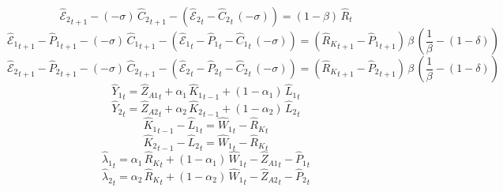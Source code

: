 \begin{dmath}
{{\hat{\mathscr{E}}_{2}}}_{t+1}-\left(-{{\sigma}}\right)\, {{\hat{C}_{2}}}_{t+1}-\left({{\hat{\mathscr{E}}_{2}}}_{t}-{{\hat{C}_{2}}}_{t}\, \left(-{{\sigma}}\right)\right)=\left(1-{{\beta}}\right)\, {{\hat{R}}}_{t}
\end{dmath}
\begin{dmath}
{{\hat{\mathscr{E}}_{1}}}_{t+1}-{{\hat{P}_{1}}}_{t+1}-\left(-{{\sigma}}\right)\, {{\hat{C}_{1}}}_{t+1}-\left({{\hat{\mathscr{E}}_{1}}}_{t}-{{\hat{P}_{1}}}_{t}-{{\hat{C}_{1}}}_{t}\, \left(-{{\sigma}}\right)\right)=\left({{\hat{R}_{K}}}_{t+1}-{{\hat{P}_{1}}}_{t+1}\right)\, {{\beta}}\, \left(\frac{1}{{{\beta}}}-\left(1-{{\delta}}\right)\right)
\end{dmath}
\begin{dmath}
{{\hat{\mathscr{E}}_{2}}}_{t+1}-{{\hat{P}_{2}}}_{t+1}-\left(-{{\sigma}}\right)\, {{\hat{C}_{2}}}_{t+1}-\left({{\hat{\mathscr{E}}_{2}}}_{t}-{{\hat{P}_{2}}}_{t}-{{\hat{C}_{2}}}_{t}\, \left(-{{\sigma}}\right)\right)=\left({{\hat{R}_{K}}}_{t+1}-{{\hat{P}_{2}}}_{t+1}\right)\, {{\beta}}\, \left(\frac{1}{{{\beta}}}-\left(1-{{\delta}}\right)\right)
\end{dmath}
\begin{dmath}
{{\hat{Y}_{1}}}_{t}={{\hat{Z}_{A1}}}_{t}+{{\alpha_{1}}}\, {{\hat{K}_{1}}}_{t-1}+\left(1-{{\alpha_{1}}}\right)\, {{\hat{L}_{1}}}_{t}
\end{dmath}
\begin{dmath}
{{\hat{Y}_{2}}}_{t}={{\hat{Z}_{A2}}}_{t}+{{\alpha_{2}}}\, {{\hat{K}_{2}}}_{t-1}+\left(1-{{\alpha_{2}}}\right)\, {{\hat{L}_{2}}}_{t}
\end{dmath}
\begin{dmath}
{{\hat{K}_{1}}}_{t-1}-{{\hat{L}_{1}}}_{t}={{\hat{W}_{1}}}_{t}-{{\hat{R}_{K}}}_{t}
\end{dmath}
\begin{dmath}
{{\hat{K}_{2}}}_{t-1}-{{\hat{L}_{2}}}_{t}={{\hat{W}_{1}}}_{t}-{{\hat{R}_{K}}}_{t}
\end{dmath}
\begin{dmath}
{{\hat{\lambda}_{1}}}_{t}={{\alpha_{1}}}\, {{\hat{R}_{K}}}_{t}+\left(1-{{\alpha_{1}}}\right)\, {{\hat{W}_{1}}}_{t}-{{\hat{Z}_{A1}}}_{t}-{{\hat{P}_{1}}}_{t}
\end{dmath}
\begin{dmath}
{{\hat{\lambda}_{2}}}_{t}={{\alpha_{2}}}\, {{\hat{R}_{K}}}_{t}+\left(1-{{\alpha_{2}}}\right)\, {{\hat{W}_{1}}}_{t}-{{\hat{Z}_{A2}}}_{t}-{{\hat{P}_{2}}}_{t}
\end{dmath}
